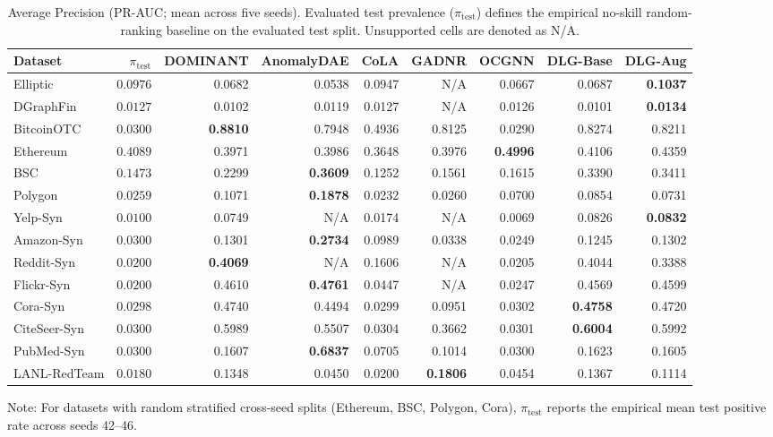 \documentclass[11pt,a4paper]{article}
\begin{document}
\begin{table}[htbp]
\centering\footnotesize\setlength{\tabcolsep}{1.8pt}
\caption{Average Precision (PR-AUC; mean across five seeds). Evaluated test prevalence ($\pi_{\mathrm{test}}$) defines the empirical no-skill random-ranking baseline on the evaluated test split. Unsupported cells are denoted as N/A.}
\label{tab:pr_auc_main}
\begin{tabular*}{\textwidth}{@{\extracolsep{\fill}}lrrrrrrrr}\toprule
\textbf{Dataset} & $\pi_{\mathrm{test}}$ & \textbf{DOMINANT} & \textbf{AnomalyDAE} & \textbf{CoLA} & \textbf{GADNR} & \textbf{OCGNN} & \textbf{DLG-Base} & \textbf{DLG-Aug} \\\midrule
Elliptic & $0.0976$ & 0.0682 & 0.0538 & 0.0947 & N/A & 0.0667 & 0.0687 & \textbf{0.1037} \\
DGraphFin & $0.0127$ & 0.0102 & 0.0119 & 0.0127 & N/A & 0.0126 & 0.0101 & \textbf{0.0134} \\
BitcoinOTC & $0.0300$ & \textbf{0.8810} & 0.7948 & 0.4936 & 0.8125 & 0.0290 & 0.8274 & 0.8211 \\
Ethereum & $0.4089$ & 0.3971 & 0.3986 & 0.3648 & 0.3976 & \textbf{0.4996} & 0.4106 & 0.4359 \\
BSC & $0.1473$ & 0.2299 & \textbf{0.3609} & 0.1252 & 0.1561 & 0.1615 & 0.3390 & 0.3411 \\
Polygon & $0.0259$ & 0.1071 & \textbf{0.1878} & 0.0232 & 0.0260 & 0.0700 & 0.0854 & 0.0731 \\
Yelp-Syn & $0.0100$ & 0.0749 & N/A & 0.0174 & N/A & 0.0069 & 0.0826 & \textbf{0.0832} \\
Amazon-Syn & $0.0300$ & 0.1301 & \textbf{0.2734} & 0.0989 & 0.0338 & 0.0249 & 0.1245 & 0.1302 \\
Reddit-Syn & $0.0200$ & \textbf{0.4069} & N/A & 0.1606 & N/A & 0.0205 & 0.4044 & 0.3388 \\
Flickr-Syn & $0.0200$ & 0.4610 & \textbf{0.4761} & 0.0447 & N/A & 0.0247 & 0.4569 & 0.4599 \\
Cora-Syn & $0.0298$ & 0.4740 & 0.4494 & 0.0299 & 0.0951 & 0.0302 & \textbf{0.4758} & 0.4720 \\
CiteSeer-Syn & $0.0300$ & 0.5989 & 0.5507 & 0.0304 & 0.3662 & 0.0301 & \textbf{0.6004} & 0.5992 \\
PubMed-Syn & $0.0300$ & 0.1607 & \textbf{0.6837} & 0.0705 & 0.1014 & 0.0300 & 0.1623 & 0.1605 \\\midrule
LANL-RedTeam & $0.0180$ & 0.1348 & 0.0450 & 0.0200 & \textbf{0.1806} & 0.0454 & 0.1367 & 0.1114 \\\bottomrule
\end{tabular*}
\begin{tablenotes}\footnotesize
\item Note: For datasets with random stratified cross-seed splits (Ethereum, BSC, Polygon, Cora), $\pi_{\mathrm{test}}$ reports the empirical mean test positive rate across seeds 42--46.
\end{tablenotes}
\end{table}
\end{document}
